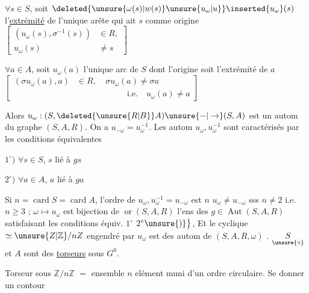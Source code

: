 $\forall s\in S$, soit $\deleted{\unsure{\omega(s)|w(s)}\unsure{u_{\omega}|u}}\inserted{u_{\omega}}(s)$ l'\uline{extrémité} de l'unique arête  qui ait  $s$ comme origine $\left[\begin{aligned}(u_{\omega}(s),\sigma^{-1}(s))&\in R,\\u_{\omega}(s)&\ne s\end{aligned}\right]$

$\forall a\in A$, soit $u_{\omega}(a)$ l'unique arc de $S$ dont l'origine soit l'extrémité de $a$ $\left[\begin{aligned}
(\sigma u_{\omega}(a),a)&\in R,\quad \sigma u_{\omega}(a)\ne\sigma a\\
&\hspace{6em}\text{i.e.}\quad u_{\omega}(a)\ne a
\end{aligned}\right]$

\margin{$\big\}$}Alors $u_{\omega}:(S,\deleted{\unsure{R|B}}A)\unsure{-|\to}(S,A)$ est un autom du graphe $(S,A,R)$. On a $u_{-\omega}=u_{\omega}^{-1}$. Les autom $u_{\omega},u_{\omega}^{-1}$ sont caractérisés par les  conditions équivalentes

$1^{\circ})$ $\forall s\in S$, $s$ lié à $gs$

$2^{\circ})$ $\forall a\in A$, $a$ lié à $ga$

Si $n=\operatorname{card}S=\operatorname{card}A$, l'ordre de $u_{\omega},u_{\omega}^{-1}=u_{-\omega}$ est $n$  $u_{\omega}\ne u_{-\omega}$ sss $n\ne2$ i.e. $n\geq3$ ;  $\omega\longmapsto u_{\omega}$ est bijection de $\operatorname{or}(S,A,R)$  l'ens des $g\in\operatorname{Aut}(S,A,R)$ satisfaisant les conditions équiv. $1^{\circ}$  $2^{\circ}\unsure{)}\big\}$, Et le  cyclique $\simeq\unsure{Z|\mathbb{Z}}/nZ$ engendré par $u_{\omega}$ est    des autom  de $(S,A,R,\omega)$ . $\underset{\unsure{\circ}}{S}$ et $A$ sont des \uline{torseurs} sous $G^{0}$.


Torseur sous $\mathbb{Z}/n\mathbb{Z}$  $=$ ensemble  $n$ elément muni d'un ordre \unsure{$^{\times}$|$^{*}$} circulaire. Se donner un contour
\normalmarginpar
